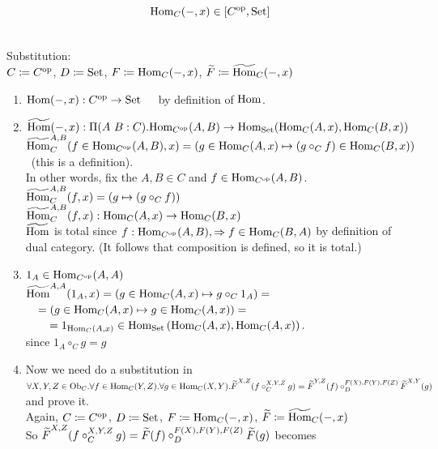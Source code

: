 \documentclass[10pt,a4paper]{article}
\begin{document}
\begin{lemma}
$${\textrm{Hom}}_C(-, x) \in [C^{\textrm{op}},{\textrm{Set}}]$$
\end{lemma}

\myprf\\
Substitution:\\
$C \coloneqq C^{\textrm{op}}$, 
$D \coloneqq {\textrm{Set}}$, 
$F \coloneqq {\textrm{Hom}}_C(-,x)$, 
${\widetilde{F}\textrm{}} \coloneqq {\widetilde{{\textrm{Hom}}}\textrm{}}_C(-,x)$\\
\begin{enumerate}
\item ${\textrm{Hom}}(-, x) : C^{\textrm{op}} \to {\textrm{Set}}$\ \ \ by definition of ${\textrm{Hom}}$.
\item $\HomMor(-, x) :\Pi(A\ B:C).\Hom_{C^\op}(A,B) \to \Hom_\Set(\Hom_C(A,x), \Hom_C(B,x))$\\
${\widetilde{{\textrm{Hom}}}\textrm{}}_C^{A,B}(f\in{\textrm{Hom}}_{C^{\textrm{op}}}(A,B), x) = (g \in{\textrm{Hom}}_C(A,x) \mapsto (g \circ_C f) \in{\textrm{Hom}}_C(B,x))$\ (this is a definition).\\
In other words, fix the $A,B\in C$ and $f\in{\textrm{Hom}}_{C^{\textrm{op}}}(A,B)$.\\
${\widetilde{{\textrm{Hom}}}\textrm{}}_C^{A,B}(f, x) = (g\mapsto (g \circ_C f))$\\
${\widetilde{{\textrm{Hom}}}\textrm{}}_C^{A,B}(f, x) : {\textrm{Hom}}_C(A,x) \to {\textrm{Hom}}_C(B,x)$
\\
${\widetilde{{\textrm{Hom}}}\textrm{}}$ is total since $f:{\textrm{Hom}}_{C^{\textrm{op}}}(A,B), \Rightarrow f\in{\textrm{Hom}}_C(B,A)$ by definition of dual category. (It follows that composition is defined, so it is total.)
\item $1_A\in{\textrm{Hom}}_{C^{\textrm{op}}}(A,A)$\\
${\widetilde{{\textrm{Hom}}}\textrm{}}^{A,A}(1_A, x) = \left(g \in{\textrm{Hom}}_C(A,x)\mapsto g \circ_C 1_A\right) = $\\
$\quad = \left(g \in{\textrm{Hom}}_C(A,x) \mapsto g \in{\textrm{Hom}}_C(A,x)\right) =$\\
$\quad \quad = 1_{{\textrm{Hom}}_C(A,x)} \in {\textrm{Hom}}_{\textrm{Set}}\left({\textrm{Hom}}_C(A,x), {\textrm{Hom}}_C(A,x)\right).$\\
since $1_A \circ_C g = g$\\
\item Now we need do a substitution in
$\forall X,Y,Z \in {\textrm{Ob}}_C.\forall f\in{\textrm{Hom}}_C(Y,Z).\forall g\in{\textrm{Hom}}_C(X,Y). {\widetilde{F}\textrm{}}^{X,Z}(f\circ_C^{X,Y,Z} g)={\widetilde{F}\textrm{}}^{Y,Z}(f)\circ_D^{F(X),F(Y),F(Z)} {\widetilde{F}\textrm{}}^{X,Y}(g)$ and prove it.\\
Again, $C \coloneqq C^{\textrm{op}}$, 
$D \coloneqq {\textrm{Set}}$, 
$F \coloneqq {\textrm{Hom}}_C(-,x)$, 
${\widetilde{F}\textrm{}} \coloneqq {\widetilde{{\textrm{Hom}}}\textrm{}}_C(-,x)$\\
So ${\widetilde{F}\textrm{}}^{X,Z}(f\circ_C^{X,Y,Z} g)={\widetilde{F}\textrm{}}(f)\circ_D^{F(X),F(Y),F(Z)} {\widetilde{F}\textrm{}}(g)$ becomes\\

\end{enumerate}
\end{document}
